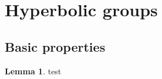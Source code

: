 \documentclass[12pt,a4paper]{article}
\theoremstyle{definition}
\newtheorem{lem}[thm]{Lemma}
\begin{document}
\section{Hyperbolic groups}
\subsection{Basic properties}

\begin{lem}
	test
\end{lem}
\end{document}
